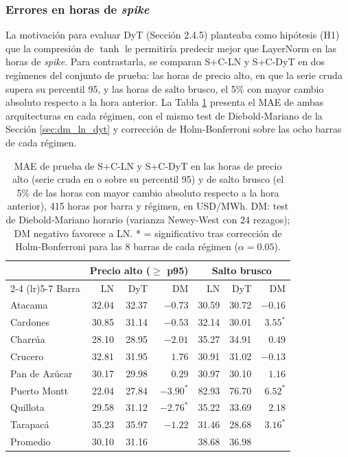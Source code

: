 \subsubsection{Errores en horas de \textit{spike}}
\label{sec:ln_dyt_spikes}

La motivación para evaluar DyT (Sección 2.4.5) planteaba como hipótesis (H1) que la compresión de $\tanh$ le permitiría predecir mejor que LayerNorm en las horas de \textit{spike}. Para contrastarla, se comparan S+C-LN y S+C-DyT en dos regímenes del conjunto de prueba: las horas de precio alto, en que la serie cruda supera su percentil 95, y las horas de salto brusco, el 5\% con mayor cambio absoluto respecto a la hora anterior. La Tabla \ref{tab:ln_dyt_spikes} presenta el MAE de ambas arquitecturas en cada régimen, con el mismo test de Diebold-Mariano de la Sección \ref{sec:dm_ln_dyt} y corrección de Holm-Bonferroni sobre las ocho barras de cada régimen.

\begin{table}[htbp]
    \centering
    \small
    \begin{tabular}{lrrrrrr}
        \toprule
        & \multicolumn{3}{c}{Precio alto ($\geq$ p95)} & \multicolumn{3}{c}{Salto brusco} \\
        \cmidrule(lr){2-4} \cmidrule(lr){5-7}
        Barra & LN & DyT & DM & LN & DyT & DM \\
        \midrule
        Atacama       & 32.04 & 32.37 & $-0.73$  & 30.59 & 30.72 & $-0.16$ \\
        Cardones      & 30.85 & 31.14 & $-0.53$  & 32.14 & 30.01 & $3.55^*$ \\
        Charrúa       & 28.10 & 28.95 & $-2.01$  & 35.27 & 34.91 & $0.49$ \\
        Crucero       & 32.81 & 31.95 & $1.76$   & 30.91 & 31.02 & $-0.13$ \\
        Pan de Azúcar & 30.17 & 29.98 & $0.29$   & 30.97 & 30.10 & $1.16$ \\
        Puerto Montt  & 22.04 & 27.84 & $-3.90^*$ & 82.93 & 76.70 & $6.52^*$ \\
        Quillota      & 29.58 & 31.12 & $-2.76^*$ & 35.22 & 33.69 & $2.18$ \\
        Tarapacá      & 35.23 & 35.97 & $-1.22$  & 31.46 & 28.68 & $3.16^*$ \\
        \midrule
        Promedio      & 30.10 & 31.16 &          & 38.68 & 36.98 & \\
        \bottomrule
    \end{tabular}
    \vspace{0.2cm}
    \caption{MAE de prueba de S+C-LN y S+C-DyT en las horas de precio alto (serie cruda en o sobre su percentil 95) y de salto brusco (el 5\% de las horas con mayor cambio absoluto respecto a la hora anterior), 415 horas por barra y régimen, en USD/MWh. DM: test de Diebold-Mariano horario (varianza Newey-West con 24 rezagos); DM negativo favorece a LN. * = significativo tras corrección de Holm-Bonferroni para las 8 barras de cada régimen ($\alpha=0.05$).}
    \label{tab:ln_dyt_spikes}
\end{table}

